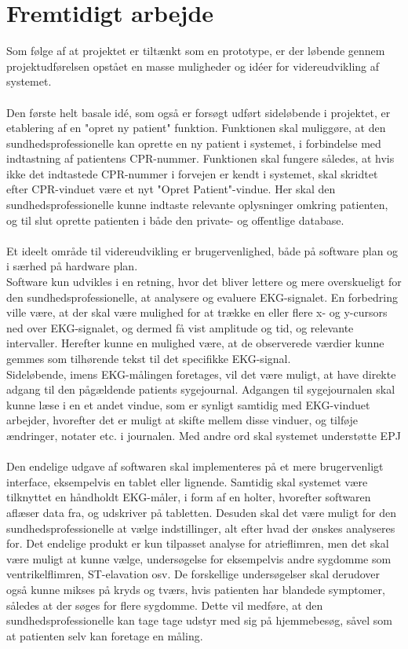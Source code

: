 \section{Fremtidigt arbejde}
Som følge af at projektet er tiltænkt som en prototype, er der løbende gennem projektudførelsen opstået en masse muligheder og idéer for videreudvikling af systemet. \\\\
Den første helt basale idé, som også er forsøgt udført sideløbende i projektet, er etablering af en "opret ny patient" funktion. Funktionen skal muliggøre, at den sundhedsprofessionelle kan oprette en ny patient i systemet, i forbindelse med indtastning af patientens CPR-nummer. Funktionen skal fungere således, at hvis ikke det indtastede CPR-nummer i forvejen er kendt i systemet, skal skridtet efter CPR-vinduet være et nyt "Opret Patient"-vindue. Her skal den sundhedsprofessionelle kunne indtaste relevante oplysninger omkring patienten, og til slut oprette patienten i både den private- og offentlige database.\\\\
Et ideelt område til videreudvikling er brugervenlighed, både på software plan og i særhed på hardware plan.\\
Software kun udvikles i en retning, hvor det bliver lettere og mere overskueligt for den sundhedsprofessionelle, at analysere og evaluere EKG-signalet. En forbedring ville være, at der skal være mulighed for at trække en eller flere x- og y-cursors ned over EKG-signalet, og dermed få vist amplitude og tid, og relevante intervaller. Herefter kunne en mulighed være, at de observerede værdier kunne gemmes som tilhørende tekst til det specifikke EKG-signal. \\
Sideløbende, imens EKG-målingen foretages, vil det være muligt, at have direkte adgang til den pågældende patients sygejournal. Adgangen til sygejournalen skal kunne læse i en et andet vindue, som er synligt samtidig med EKG-vinduet arbejder, hvorefter det er muligt at skifte mellem disse vinduer, og tilføje ændringer, notater etc. i journalen. Med andre ord skal systemet understøtte EPJ\\ \\
Den endelige udgave af softwaren skal implementeres på et mere brugervenligt interface, eksempelvis en tablet eller lignende. Samtidig skal systemet være tilknyttet en håndholdt EKG-måler, i form af en holter, hvorefter softwaren aflæser data fra, og udskriver på tabletten. Desuden skal det være muligt for den sundhedsprofessionelle at vælge indstillinger, alt efter hvad der ønskes analyseres for. Det endelige produkt er kun tilpasset analyse for atrieflimren, men det skal være muligt at kunne vælge, undersøgelse for eksempelvis andre sygdomme som ventrikelflimren, ST-elavation osv. De forskellige undersøgelser skal derudover også kunne mikses på kryds og tværs, hvis patienten har blandede symptomer, således at der søges for flere sygdomme. Dette vil medføre, at den sundhedsprofessionelle kan tage tage udstyr med sig på hjemmebesøg, såvel som at patienten selv kan foretage en måling.

